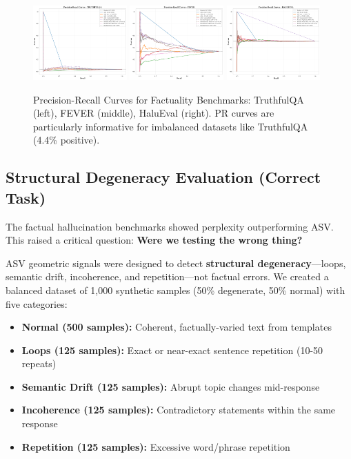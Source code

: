 \documentclass[11pt]{article}
\begin{document}
\begin{figure}[h]
\centering
\includegraphics[width=0.32\textwidth]{figures/truthfulqa_pr_curves.png}
\includegraphics[width=0.32\textwidth]{figures/fever_pr_curves.png}
\includegraphics[width=0.32\textwidth]{figures/halueval_pr_curves.png}
\caption{Precision-Recall Curves for Factuality Benchmarks: TruthfulQA (left), FEVER (middle), HaluEval (right). PR curves are particularly informative for imbalanced datasets like TruthfulQA (4.4\% positive).}
\label{fig:factuality-pr}
\end{figure}

\subsection{Structural Degeneracy Evaluation (Correct Task)}
\label{sec:eval-degeneracy}

The factual hallucination benchmarks showed perplexity outperforming ASV. This raised a critical question: \textbf{Were we testing the wrong thing?}

ASV geometric signals were designed to detect \textbf{structural degeneracy}---loops, semantic drift, incoherence, and repetition---not factual errors. We created a balanced dataset of 1,000 synthetic samples (50\% degenerate, 50\% normal) with five categories:

\begin{itemize}
\item \textbf{Normal (500 samples):} Coherent, factually-varied text from templates
\item \textbf{Loops (125 samples):} Exact or near-exact sentence repetition (10-50 repeats)
\item \textbf{Semantic Drift (125 samples):} Abrupt topic changes mid-response
\item \textbf{Incoherence (125 samples):} Contradictory statements within the same response
\item \textbf{Repetition (125 samples):} Excessive word/phrase repetition
\end{itemize}
\end{document}
